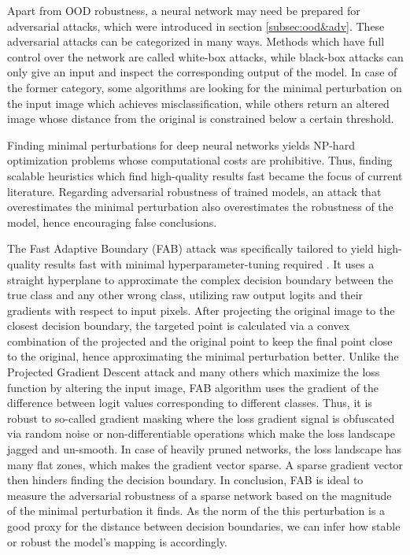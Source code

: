Apart from OOD robustness, a neural network may need be prepared for adversarial attacks, which were introduced in section \ref{subsec:ood&adv}. These adversarial attacks
can be categorized in many ways. Methods which have full control over the network are called white-box attacks, while black-box attacks can only give an input and inspect
 the corresponding output of the model. In case of the former category, some algorithms are looking for the minimal perturbation on the input image which achieves
  misclassification, while others return an altered image whose distance from the original is constrained below a certain threshold.  

Finding minimal perturbations for deep neural networks yields NP-hard optimization problems whose computational costs are prohibitive. Thus, finding scalable heuristics
which find high-quality results fast became the focus of current literature. Regarding adversarial robustness of trained models, an attack that overestimates the minimal 
perturbation also overestimates the robustness of the model, hence encouraging false conclusions. 

The Fast Adaptive Boundary (FAB) attack was specifically tailored to yield high-quality results fast with minimal hyperparameter-tuning required \cite{fab}. It uses a straight
hyperplane to approximate the complex decision boundary between the true class and any other wrong class, utilizing raw output logits and their gradients with respect to
input pixels. After projecting the original image to the closest decision boundary, the targeted point is calculated via a convex combination of the projected and the original point
to keep the final point close to the original, hence approximating the minimal perturbation better. Unlike the Projected Gradient Descent attack and many others which maximize the loss
function by altering the input image, FAB algorithm uses the gradient of the difference between logit values corresponding to different classes. Thus, it is robust to so-called 
gradient masking where the loss gradient signal is obfuscated via random noise or non-differentiable operations which make the loss landscape jagged and un-smooth. 
In case of heavily pruned networks, the loss landscape has many flat zones, which makes the gradient vector sparse. A sparse gradient vector then hinders finding the decision boundary.
In conclusion, FAB is ideal to measure the adversarial robustness of a sparse network based on the magnitude of the minimal perturbation it finds. As the norm of the this
perturbation is a good proxy for the distance between decision boundaries, we can infer how stable or robust the model's mapping is accordingly.


